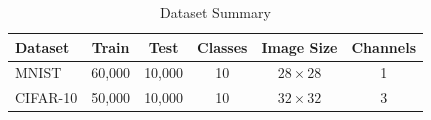 \begin{table}[htbp]
\caption{Dataset Summary}
\centering
\begin{tabular}{|l|c|c|c|c|c|}
\hline
\textbf{Dataset} & \textbf{Train} & \textbf{Test} & \textbf{Classes} & \textbf{Image Size} & \textbf{Channels} \\
\hline
MNIST & 60,000 & 10,000 & 10 & $28 \times 28$ & 1 \\
\hline
CIFAR-10 & 50,000 & 10,000 & 10 & $32 \times 32$ & 3 \\
\hline
\end{tabular}
\label{tab:dataset_summary}
\end{table}